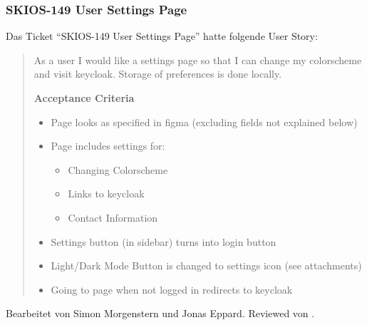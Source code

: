 \subsubsection{SKIOS-149 User Settings Page}
Das Ticket \enquote{SKIOS-149 User Settings Page} hatte folgende User Story:
\begin{quotation}
As a user I would like a settings page so that I can change my colorscheme and visit keycloak.
Storage of preferences is done locally.

\textbf{Acceptance Criteria}
\begin{itemize}
    \item Page looks as specified in figma (excluding fields not explained below)
    \item Page includes settings for:
    \begin{itemize}
        \item Changing Colorscheme
        \item Links to keycloak
        \item Contact Information
    \end{itemize}
    \item Settings button (in sidebar) turns into login button
    \item Light/Dark Mode Button is changed to settings icon (see attachments)
    \item Going to page when not logged in redirects to keycloak
\end{itemize}
\end{quotation}
Bearbeitet von Simon Morgenstern und Jonas Eppard.
Reviewed von .
